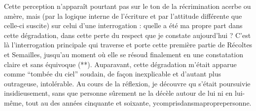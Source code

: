 Cette perception n'apparaît pourtant pas sur le ton de la récrimination acerbe ou amère, mais (par la logique interne de l'écriture et par l'attitude différente que celle-ci suscite) sur celui d'une i\enspace n\enspace t\enspace e\enspace r\enspace r\enspace o\enspace g\enspace a\enspace t\enspace i\enspace o\enspace n : quelle a été ma propre part dans cette dégradation, dans cette perte du respect que je constate aujourd'hui ? C'est là l'interrogation principale qui traverse et porte cette première partie de\margin{\unsure{(!)}} Récoltes et Semailles, jusqu'au moment où elle se résoud finalement en une constatation claire et sans équivoque (**). Auparavant, cette dégradation m'était apparue comme ``tombée du ciel'' soudain, de façon inexplicable et d'autant plus outrageuse, intolérable. Au cours de la réflexion, je découvre qu   s'était  poursuivie insidieusement, sans que personne sûrement ne la décèle autour de lui ni en lui-même, tout au  des années cinquante et soixante, y\quad c\enspace o\enspace m\enspace p\enspace r\enspace i\enspace s\quad d\enspace a\enspace n\enspace s\quad m\enspace a\quad p\enspace r\enspace o\enspace p\enspace r\enspace e\quad p\enspace e\enspace r\enspace s\enspace o\enspace n\enspace n\enspace e.

